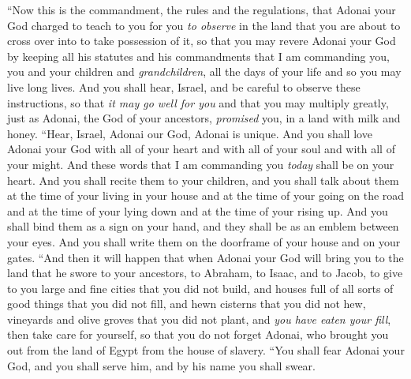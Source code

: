 \begin{biblechapter} %
 “Now this is the commandment, the rules and the regulations, that Adonai your God charged to teach to you for you \textit{to observe} in the land that you are about to cross over into to take possession of it,
\verse so that you may revere Adonai your God by keeping all his statutes and his commandments that I am commanding you, you and your children and \textit{grandchildren}, all the days of your life and so you may live long lives.
\verse And you shall hear, Israel, and be careful to observe these instructions, so that \textit{it may go well for you} and that you may multiply greatly, just as Adonai, the God of your ancestors, \textit{promised} you, in a land with milk and honey.
\verse “Hear, Israel, Adonai our God, Adonai is unique.
\verse And you shall love Adonai your God with all of your heart and with all of your soul and with all of your might.
\verse And these words that I am commanding you \textit{today} shall be on your heart.
\verse And you shall recite them to your children, and you shall talk about them at the time of your living in your house and at the time of your going on the road and at the time of your lying down and at the time of your rising up.
\verse And you shall bind them as a sign on your hand, and they shall be as an emblem between your eyes.
\verse And you shall write them on the doorframe of your house and on your gates.
\verse “And then it will happen that when Adonai your God will bring you to the land that he swore to your ancestors, to Abraham, to Isaac, and to Jacob, to give to you large and fine cities that you did not build,
\verse and houses full of all sorts of good things that you did not fill, and hewn cisterns that you did not hew, vineyards and olive groves that you did not plant, and \textit{you have eaten your fill},
\verse then take care for yourself, so that you do not forget Adonai, who brought you out from the land of Egypt from the house of slavery.
\verse “You shall fear Adonai your God, and you shall serve him, and by his name you shall swear.

\end{biblechapter}
